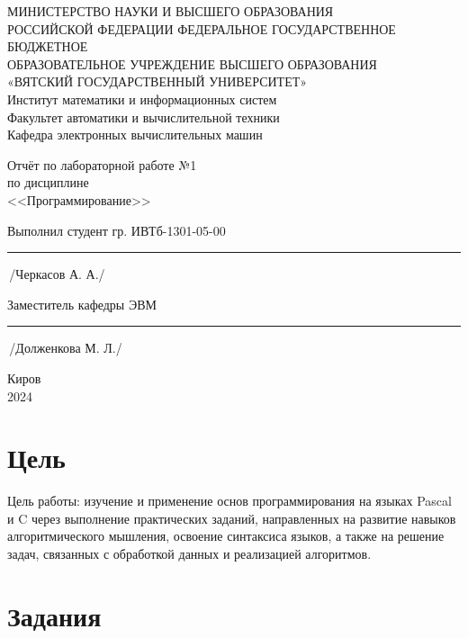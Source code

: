 \documentclass[oneside,a4paper,14pt]{extarticle}
\begin{document}
\newpage
\thispagestyle{empty}
\begin{center}
	МИНИСТЕРСТВО НАУКИ И ВЫСШЕГО ОБРАЗОВАНИЯ\\
	РОССИЙСКОЙ ФЕДЕРАЦИИ
	ФЕДЕРАЛЬНОЕ ГОСУДАРСТВЕННОЕ БЮДЖЕТНОЕ\\
	ОБРАЗОВАТЕЛЬНОЕ
	УЧРЕЖДЕНИЕ ВЫСШЕГО ОБРАЗОВАНИЯ\\
	«ВЯТСКИЙ ГОСУДАРСТВЕННЫЙ УНИВЕРСИТЕТ»\\
	Институт математики и информационных систем\\
	Факультет автоматики и вычислительной техники\\
	Кафедра электронных вычислительных машин
\end{center}
\vspace{20mm}

\begin{center}
	Отчёт по лабораторной работе №1\\
	по дисциплине\\
	<<Программирование>>\\
\end{center}
\vspace{55mm}

Выполнил студент гр. ИВТб-1301-05-00 \hspace{5mm} \rule[-0,5mm]{30mm}{0.15mm}\,/Черкасов А. А./


Заместитель кафедры ЭВМ \hfill  \rule[-0,5mm]{30mm}{0.15mm}\,/Долженкова М. Л./

\vfill
\begin{center}
	Киров\\
	2024
\end{center}

\newpage\thispagestyle{plain}

\section*{Цель}

\sloppy Цель работы: изучение и применение основ программирования на языках Pascal и C через выполнение практических заданий, направленных на развитие навыков алгоритмического мышления, освоение синтаксиса языков, а также на решение задач, связанных с обработкой данных и реализацией алгоритмов.

\section*{Задания}
\end{document}
